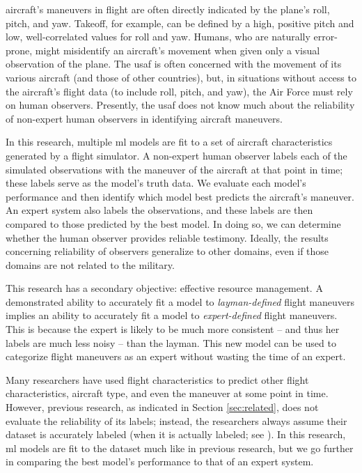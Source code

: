 \documentclass[../main.tex]{subfiles}
\begin{document}

 aircraft's maneuvers in flight are often directly indicated by the plane's roll, pitch, and yaw. Takeoff, for example, can be defined by a high, positive pitch and low, well-correlated values for roll and yaw. Humans, who are naturally error-prone, might misidentify an aircraft's movement when given only a visual observation of the plane. The \ac{usaf} is often concerned with the movement of its various aircraft (and those of other countries), but, in situations without access to the aircraft's flight data (to include roll, pitch, and yaw), the Air Force must rely on human observers. Presently, the \ac{usaf} does not know much about the reliability of non-expert human observers in identifying aircraft maneuvers.


In this research, multiple \ac{ml} models are fit to a set of aircraft characteristics generated by a flight simulator. A non-expert human observer labels each of the simulated observations with the maneuver of the aircraft at that point in time; these labels serve as the model's truth data. We evaluate each model's performance and then identify which model best predicts the aircraft's maneuver. An expert system also labels the observations, and these labels are then compared to those predicted by the best model. In doing so, we can determine whether the human observer provides reliable testimony. Ideally, the results concerning reliability of observers generalize to other domains, even if those domains are not related to the military.

This research has a secondary objective: effective resource management. A demonstrated ability to accurately fit a model to \textit{layman-defined} flight maneuvers implies an ability to accurately fit a model to \textit{expert-defined} flight maneuvers. This is because the expert is likely to be much more consistent -- and thus her labels are much less noisy -- than the layman. This new model can be used to categorize flight maneuvers as an expert without wasting the time of an expert.


Many researchers have used flight characteristics to predict other flight characteristics, aircraft type, and even the maneuver at some point in time. However, previous research, as indicated in Section \ref{sec:related}, does not evaluate the reliability of its labels; instead, the researchers always assume their dataset is accurately labeled (when it is actually labeled; see \cite{Rodin1992}). In this research, \ac{ml} models are fit to the dataset much like in previous research, but we go further in comparing the best model's performance to that of an expert system.
\end{document}
